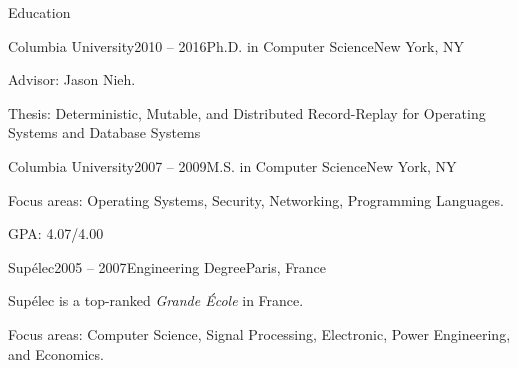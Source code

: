 \documentclass{resume} %
\newcommand{\columbia}{{Columbia University}\xspace}
\newcommand{\supelec}{{Sup\'{e}lec}\xspace}
\newcommand{\eiffel}{{Lyc\'{e}e Gustave Eiffel}\xspace}
\begin{document}
\vspace{-1em}


\begin{rSection}{Education}

\begin{rSubsection}{\columbia}{2010 -- 2016}{Ph.D. in Computer Science}{New York, NY}
\item Advisor: Jason Nieh.
\item Thesis: Deterministic, Mutable, and Distributed Record-Replay for Operating Systems and Database Systems
\end{rSubsection}

\begin{rSubsection}{\columbia}{2007 -- 2009}{M.S. in Computer Science}{New York, NY}
\item Focus areas: Operating Systems, Security, Networking, Programming Languages.
\item GPA: 4.07/4.00
\end{rSubsection}

\begin{rSubsection}{\supelec}{2005 -- 2007}{Engineering Degree}{Paris, France}
\item \supelec is a top-ranked {\em Grande \'{E}cole} in France.
\item Focus areas: Computer Science, Signal Processing, Electronic, Power Engineering, and Economics.
\end{rSubsection}


\end{rSection}

\end{document}
